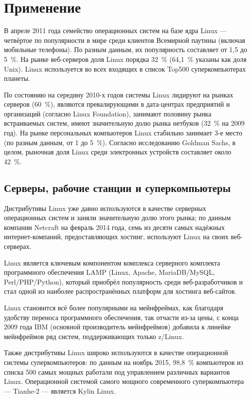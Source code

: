 \chapter*{Применение}
В апреле 2011 года семейство операционных систем на базе ядра Linux — четвёртое по популярности в мире среди клиентов Всемирной паутины (включая мобильные телефоны). По разным данным, их популярность составляет от 1,5 до 5~\%. На рынке веб-серверов доля Linux порядка 32~\% (64,1~\% указаны как доля Unix). Linux используется во всех входящих в список Top500 суперкомпьютерах планеты.

По состоянию на середину 2010-х годов системы Linux лидируют на рынках серверов (60~\%), являются превалирующими в дата-центрах предприятий и организаций (согласно Linux Foundation), занимают половину рынка встраиваемых систем, имеют значительную долю рынка нетбуков (32~\% на 2009 год). На рынке персональных компьютеров Linux стабильно занимает 3-е место (по разным данным, от 1 до 5~\%). Согласно исследованию Goldman Sachs, в целом, рыночная доля Linux среди электронных устройств составляет около 42~\%.

\section*{Серверы, рабочие станции и суперкомпьютеры}
Дистрибутивы Linux уже давно используются в качестве серверных операционных систем и заняли значительную долю этого рынка; по данным компании Netcraft на февраль 2014 года, семь из десяти самых надёжных интернет-компаний, предоставляющих хостинг, используют Linux на своих веб-серверах.

Linux является ключевым компонентом комплекса серверного комплекта программного обеспечения LAMP (Linux, Apache, MariaDB/MySQL, Perl/PHP/Python), который приобрёл популярность среди веб-разработчиков и стал одной из наиболее распространённых платформ для хостинга веб-сайтов.

Linux становится всё более популярными на мейнфреймах, как благодаря удобству переноса программного обеспечения, так отчасти из-за цены, с конца 2009 года IBM (основной производитель мейнфреймов) добавила к линейке мейнфреймов ряд систем, поддерживающих только z/Linux.

Также дистрибутивы Linux широко используются в качестве операционной системы суперкомпьютеров: по данным на ноябрь 2015, 98,8~\% компьютеров из списка 500 самых мощных работали под управлением различных вариантов Linux. Операционной системой самого мощного современного суперкомпьютера — Tianhe-2 — является Kylin Linux.


